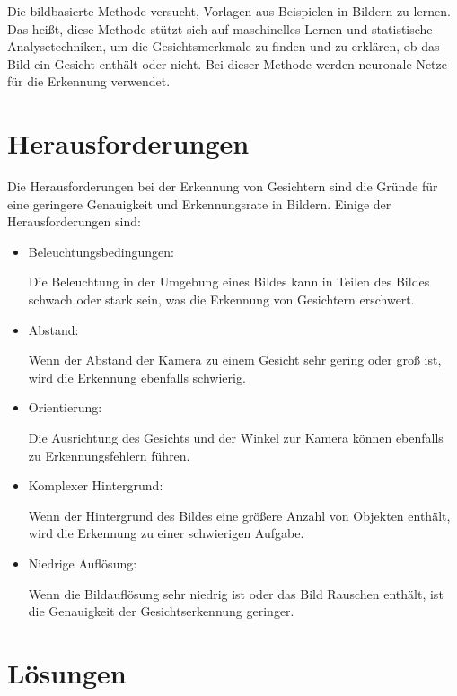 Die bildbasierte Methode versucht, Vorlagen aus Beispielen in Bildern zu lernen. Das heißt, diese Methode stützt sich auf maschinelles Lernen und statistische Analysetechniken, um die Gesichtsmerkmale zu finden und zu erklären, ob das Bild ein Gesicht enthält oder nicht. Bei dieser Methode werden neuronale Netze für die Erkennung verwendet. 



\section{Herausforderungen}

Die Herausforderungen bei der Erkennung von Gesichtern sind die Gründe für eine geringere Genauigkeit und Erkennungsrate in Bildern. Einige der Herausforderungen sind:

\begin{itemize}
	\item Beleuchtungsbedingungen: 
	
	Die Beleuchtung in der Umgebung eines Bildes kann in Teilen des Bildes schwach oder stark sein, was die Erkennung von Gesichtern erschwert.
	\item Abstand: 
	
	Wenn der Abstand der Kamera zu einem Gesicht sehr gering oder groß ist, wird die Erkennung ebenfalls schwierig.
	\item Orientierung: 
	
	Die Ausrichtung des Gesichts und der Winkel zur Kamera können ebenfalls zu Erkennungsfehlern führen.
	\item Komplexer Hintergrund: 
	
	Wenn der Hintergrund des Bildes eine größere Anzahl von Objekten enthält, wird die Erkennung zu einer schwierigen Aufgabe.
	\item Niedrige Auflösung: 
	
	Wenn die Bildauflösung sehr niedrig ist oder das Bild Rauschen enthält, ist die Genauigkeit der Gesichtserkennung geringer.
\end{itemize}

\section{Lösungen}

